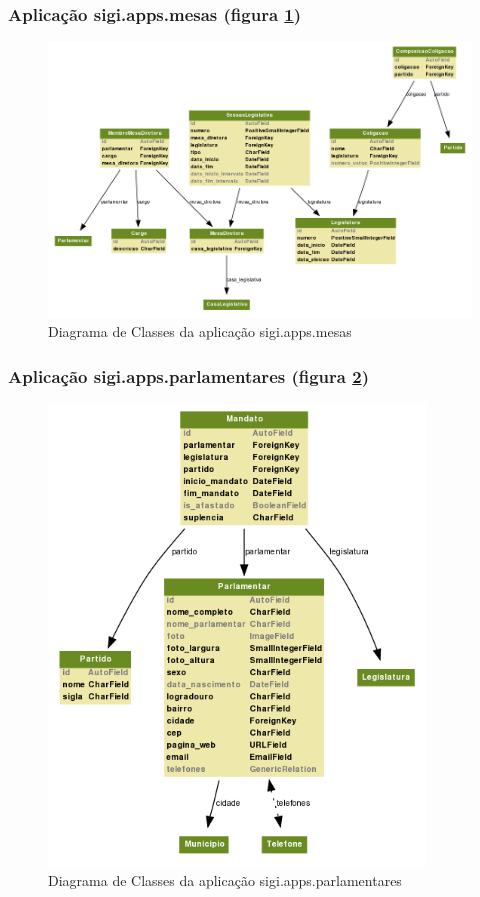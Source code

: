 \subsubsection{Aplicação sigi.apps.mesas (figura \ref{fig:mesas})}
\begin{figure}[h]
  \centering
  \includegraphics[width=145mm]{../imagens/mesas.png}
  \caption{Diagrama de Classes da aplicação sigi.apps.mesas}
  \label{fig:mesas}
\end{figure}

\subsubsection{Aplicação sigi.apps.parlamentares (figura \ref{fig:parlamentares})}
\begin{figure}[h]
  \centering
  \includegraphics[width=100mm]{../imagens/parlamentares.png}
  \caption{Diagrama de Classes da aplicação sigi.apps.parlamentares}
  \label{fig:parlamentares}
\end{figure}

